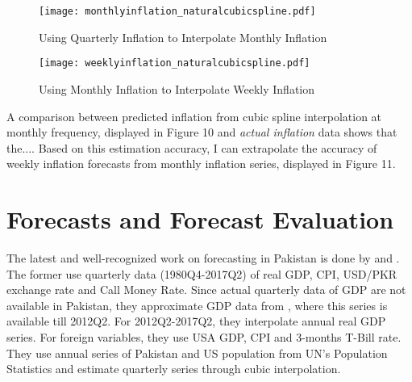 \documentclass[12pt]{article}
\newcommand{\1}{\mathbbm 1}
\begin{document}
	
		
		
		
		
		
		
		
		
		
		
		
		
		\begin{figure}[H]
			\begin{Center}
				\texttt{[image: monthlyinflation\_naturalcubicspline.pdf]}
				\caption{Using Quarterly Inflation to Interpolate Monthly Inflation}
			\end{Center}
		\end{figure}
		
		
		
		
		\begin{figure}[H]
			\begin{Center}
				\texttt{[image: weeklyinflation\_naturalcubicspline.pdf]}
				\caption{Using Monthly Inflation to Interpolate Weekly Inflation}
			\end{Center}
		\end{figure}
		
			A comparison between predicted inflation from cubic spline interpolation at monthly frequency, displayed in Figure 10 and \textit{actual inflation} data shows that the.... Based on this estimation accuracy, I can extrapolate the accuracy of weekly inflation forecasts from monthly inflation series, displayed in Figure 11.
		
		
		
		\section{Forecasts and Forecast Evaluation}
		
		
		
		The latest and well-recognized work on forecasting in Pakistan is done by \cite{ahmad2019evaluation} and \cite{syed2021macroeconomic}. The former use quarterly data (1980Q4-2017Q2) of real GDP, CPI, USD/PKR exchange rate and Call Money Rate. Since actual quarterly data of GDP are not available in Pakistan, they approximate GDP data from \cite{hanif2018thick}, where this series is available till 2012Q2. For 2012Q2-2017Q2, they interpolate annual real GDP series. For foreign variables, they use USA GDP, CPI and 3-months T-Bill rate. They use annual series of Pakistan and US population from UN's Population Statistics and estimate quarterly series through cubic interpolation. 
		
\end{document}
